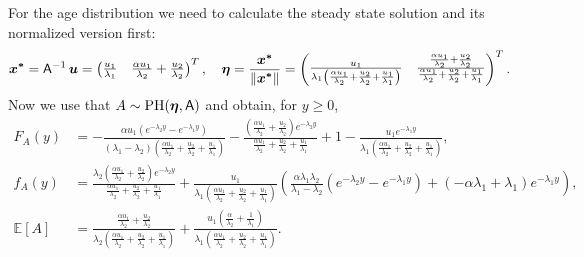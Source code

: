 \documentclass[smallextended]{svjour3}
\newcommand{\E}{\mathbb{E}}
\begin{document}
For the age distribution we need to calculate the steady state solution and its normalized version first:
\[
    \vec{x^\ast} = \tens{A}^{-1}\,\vec{u} = \left(\begin{matrix}\frac{u_{1}}{\lambda_{1}} & \frac{\alpha u_{1}}{\lambda_{2}} + \frac{u_{2}}{\lambda_{2}}\end{matrix}\right)^T,\quad
    \vec{\eta} = \frac{\vec{x^\ast}}{\|\vec{x^\ast}\|} = \left(\begin{matrix}\frac{u_{1}}{\lambda_{1} \left(\frac{\alpha u_{1}}{\lambda_{2}} + \frac{u_{2}}{\lambda_{2}} + \frac{u_{1}}{\lambda_{1}}\right)} & \frac{\frac{\alpha u_{1}}{\lambda_{2}} + \frac{u_{2}}{\lambda_{2}}}{\frac{\alpha u_{1}}{\lambda_{2}} + \frac{u_{2}}{\lambda_{2}} + \frac{u_{1}}{\lambda_{1}}}\end{matrix}\right)^T.
\]
Now we use that $A\sim\operatorname{PH}(\vec{\eta},\tens{A})$ and obtain, for $y\geq0$,
\begin{align*}
    F_A(y) &= - \frac{\alpha u_{1} \left(e^{- \lambda_{2} y} - e^{- \lambda_{1} y}\right)}{\left(\lambda_{1} - \lambda_{2}\right) \left(\frac{\alpha u_{1}}{\lambda_{2}} + \frac{u_{2}}{\lambda_{2}} + \frac{u_{1}}{\lambda_{1}}\right)} - \frac{\left(\frac{\alpha u_{1}}{\lambda_{2}} + \frac{u_{2}}{\lambda_{2}}\right) e^{- \lambda_{2} y}}{\frac{\alpha u_{1}}{\lambda_{2}} + \frac{u_{2}}{\lambda_{2}} + \frac{u_{1}}{\lambda_{1}}} + 1 - \frac{u_{1} e^{- \lambda_{1} y}}{\lambda_{1} \left(\frac{\alpha u_{1}}{\lambda_{2}} + \frac{u_{2}}{\lambda_{2}} + \frac{u_{1}}{\lambda_{1}}\right)},\\
    f_A(y) &= \frac{\lambda_{2} \left(\frac{\alpha u_{1}}{\lambda_{2}} + \frac{u_{2}}{\lambda_{2}}\right) e^{- \lambda_{2} y}}{\frac{\alpha u_{1}}{\lambda_{2}} + \frac{u_{2}}{\lambda_{2}} + \frac{u_{1}}{\lambda_{1}}} + \frac{u_{1}}{\lambda_{1} \left(\frac{\alpha u_{1}}{\lambda_{2}} + \frac{u_{2}}{\lambda_{2}} + \frac{u_{1}}{\lambda_{1}}\right)} \left(\frac{\alpha \lambda_{1} \lambda_{2}}{\lambda_{1} - \lambda_{2}} \left(e^{- \lambda_{2} y} - e^{- \lambda_{1} y}\right) + \left(- \alpha \lambda_{1} + \lambda_{1}\right) e^{- \lambda_{1} y}\right),\\
    \E[A] &= \frac{\frac{\alpha u_{1}}{\lambda_{2}} + \frac{u_{2}}{\lambda_{2}}}{\lambda_{2} \left(\frac{\alpha u_{1}}{\lambda_{2}} + \frac{u_{2}}{\lambda_{2}} + \frac{u_{1}}{\lambda_{1}}\right)} + \frac{u_{1} \left(\frac{\alpha}{\lambda_{2}} + \frac{1}{\lambda_{1}}\right)}{\lambda_{1} \left(\frac{\alpha u_{1}}{\lambda_{2}} + \frac{u_{2}}{\lambda_{2}} + \frac{u_{1}}{\lambda_{1}}\right)}.
\end{align*}
\end{document}
